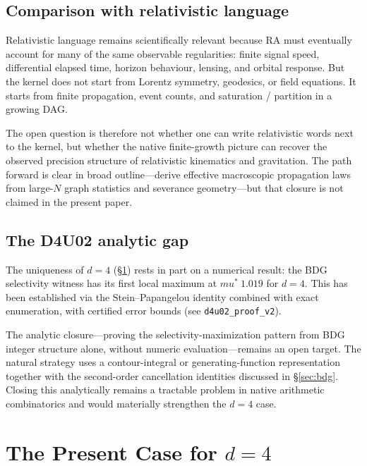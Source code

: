 \documentclass[11pt]{article}
\def\mu{mu}%
\def\approx{~}%
\begin{document}
\subsection{Comparison with relativistic language}

Relativistic language remains scientifically relevant because RA must eventually account for many of the same observable regularities: finite signal speed, differential elapsed time, horizon behaviour, lensing, and orbital response. But the kernel does not start from Lorentz symmetry, geodesics, or field equations. It starts from finite propagation, event counts, and saturation / partition in a growing DAG.

The open question is therefore not whether one can write relativistic words next to the kernel, but whether the native finite-growth picture can recover the observed precision structure of relativistic kinematics and gravitation. The path forward is clear in broad outline---derive effective macroscopic propagation laws from large-$N$ graph statistics and severance geometry---but that closure is not claimed in the present paper.

\subsection{The D4U02 analytic gap}
\label{sec:d4u02_gap}

The uniqueness of $d=4$ (\S\ref{sec:d4}) rests in part on a numerical result: the BDG selectivity witness has its first local maximum at $\mu^*\approx 1.019$ for $d=4$. This has been established via the Stein--Papangelou identity combined with exact enumeration, with certified error bounds (see \texttt{d4u02\_proof\_v2}).

The analytic closure---proving the selectivity-maximization pattern from BDG integer structure alone, without numeric evaluation---remains an open target. The natural strategy uses a contour-integral or generating-function representation together with the second-order cancellation identities discussed in \S\ref{sec:bdg}. Closing this analytically remains a tractable problem in native arithmetic combinatorics and would materially strengthen the $d=4$ case.

\section{The Present Case for $d=4$}
\label{sec:d4}
\end{document}
